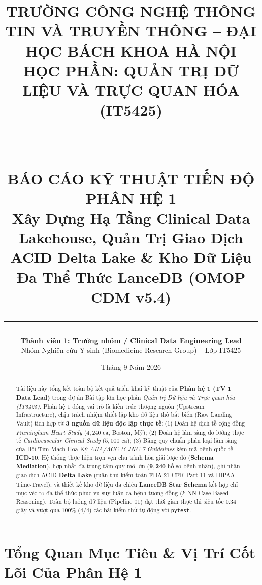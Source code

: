 \documentclass[11pt,a4paper]{article}
\title{%
  \vspace{-1.5cm}
  {\Large\bfseries TRƯỜNG CÔNG NGHỆ THÔNG TIN VÀ TRUYỀN THÔNG -- ĐẠI HỌC BÁCH KHOA HÀ NỘI}\\[0.3cm]
  {\large HỌC PHẦN: QUẢN TRỊ DỮ LIỆU VÀ TRỰC QUAN HÓA (IT5425)}\\[0.6cm]
  \rule{\textwidth}{1.5pt}\\[0.3cm]
  {\LARGE\bfseries BÁO CÁO KỸ THUẬT TIẾN ĐỘ PHÂN HỆ 1}\\[0.2cm]
  {\large\color{biomedblue}\textbf{Xây Dựng Hạ Tầng Clinical Data Lakehouse, Quản Trị Giao Dịch ACID Delta Lake \& Kho Dữ Liệu Đa Thể Thức LanceDB (OMOP CDM v5.4)}}\\[0.2cm]
  \rule{\textwidth}{0.8pt}
}
\author{%
  \textbf{Thành viên 1: Trưởng nhóm / Clinical Data Engineering Lead}\\[0.1cm]
  Nhóm Nghiên cứu Y sinh (Biomedicine Research Group) -- Lớp IT5425
}
\date{Tháng 9 Năm 2026}
\begin{document}
\maketitle
\thispagestyle{fancy}

\begin{abstract}
Tài liệu này tổng kết toàn bộ kết quả triển khai kỹ thuật của \textbf{Phân hệ 1 (TV 1 -- Data Lead)} trong dự án Bài tập lớn học phần \textit{Quản trị Dữ liệu và Trực quan hóa (IT5425)}. Phân hệ 1 đóng vai trò là kiến trúc thượng nguồn (Upstream Infrastructure), chịu trách nhiệm thiết lập kho dữ liệu thô bất biến (Raw Landing Vault) tích hợp từ \textbf{3 nguồn dữ liệu độc lập thực tế}: (1) Đoàn hệ dịch tễ cộng đồng \textit{Framingham Heart Study} ($4{,}240$ ca, Boston, Mỹ); (2) Đoàn hệ lâm sàng đo lường thực tế \textit{Cardiovascular Clinical Study} ($5{,}000$ ca); (3) Bảng quy chuẩn phân loại lâm sàng của Hội Tim Mạch Hoa Kỳ \textit{AHA/ACC \& JNC-7 Guidelines} kèm mã bệnh quốc tế \textbf{ICD-10}. Hệ thống thực hiện trọn vẹn chu trình hòa giải lược đồ (\textbf{Schema Mediation}), hợp nhất đa trung tâm quy mô lớn ($\mathbf{9{,}240}$ hồ sơ bệnh nhân), ghi nhận giao dịch ACID \textbf{Delta Lake} (tuân thủ kiểm toán FDA 21 CFR Part 11 và HIPAA Time-Travel), và thiết kế kho dữ liệu đa chiều \textbf{LanceDB Star Schema} kết hợp chỉ mục véc-tơ đa thể thức phục vụ suy luận ca bệnh tương đồng ($k$-NN Case-Based Reasoning). Toàn bộ luồng dữ liệu (Pipeline 01) đạt thời gian thực thi siêu tốc $\mathbf{0.34}$ giây và vượt qua $100\%$ ($4/4$) các bài kiểm thử tự động với \texttt{pytest}.
\end{abstract}

\vspace{0.3cm}
\tableofcontents
\vspace{0.5cm}

\section{Tổng Quan Mục Tiêu \& Vị Trí Cốt Lõi Của Phân Hệ 1}
\end{document}
